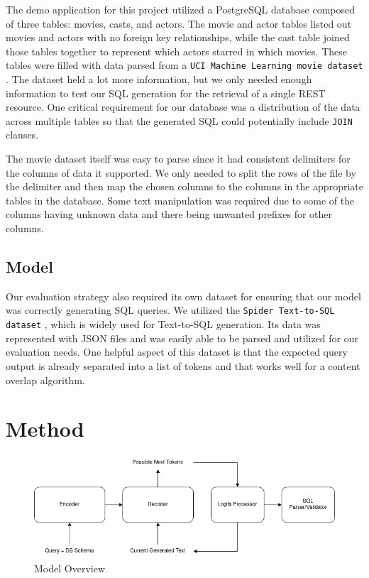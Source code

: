 \documentclass[11pt]{article}
\begin{document}
The demo application for this project utilized a PostgreSQL database composed of three tables: movies, casts, and actors. The movie and actor tables listed out movies and actors with no foreign key relationships, while the cast table joined those tables together to represent which actors starred in which movies. These tables were filled with data parsed from a \texttt{UCI Machine Learning movie dataset} \citep{misc_movie_132}. The dataset held a lot more information, but we only needed enough information to test our SQL generation for the retrieval of a single REST resource. One critical requirement for our database was a distribution of the data across multiple tables so that the generated SQL could potentially include \texttt{JOIN} clauses.

The movie dataset itself was easy to parse since it had consistent delimiters for the columns of data it supported. We only needed to split the rows of the file by the delimiter and then map the chosen columns to the columns in the appropriate tables in the database. Some text manipulation was required due to some of the columns having unknown data and there being unwanted prefixes for other columns.

\subsection{Model}

Our evaluation strategy also required its own dataset for ensuring that our model was correctly generating SQL queries. We utilized the \texttt{Spider Text-to-SQL dataset} \citep{yu2019spider}, which is widely used for Text-to-SQL generation. Its data was represented with JSON files and was easily able to be parsed and utilized for our evaluation needs. One helpful aspect of this dataset is that the expected query output is already separated into a list of tokens and that works well for a content overlap algorithm.

\section{Method}

\begin{figure}
\centering
\includegraphics[width=\textwidth]{t5-transformer.drawio.png}
\caption{\label{fig:model} Model Overview}
\end{figure}
\end{document}
